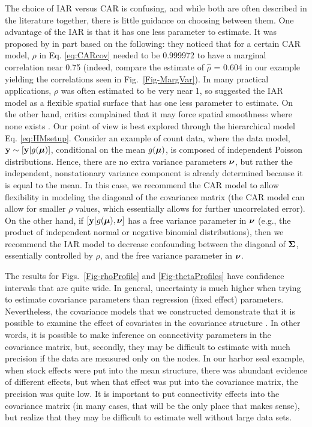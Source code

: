 \documentclass[11pt, titlepage]{article}\usepackage[]{graphicx}\usepackage[]{color}
\begin{document}
\begin{spacing}{1.9}
\begin{flushleft}
The choice of IAR versus CAR is confusing, and while both are often described in the literature together, there is little guidance on choosing between them.  One advantage of the IAR is that it has one less parameter to estimate.  It was proposed by \citet{Besa:Koop:cond:1995} in part based on the following: they noticed that for a certain CAR model, $\rho$ in Eq. \ref{eq:CARcov} needed to be 0.999972 to have a marginal correlation near 0.75 (indeed, compare the estimate of $\hat{\rho}$ = 0.604 in our example yielding the correlations seen in Fig.~\ref{Fig-MargVar}). In many practical applications, $\rho$ was often estimated to be very near 1, so \citet{Besa:Koop:cond:1995} suggested the IAR model as a flexible spatial surface that has one less parameter to estimate.  On the other hand, critics complained that it may force spatial smoothness where none exists \citep[e.g.,][]{Lero:Lei:Bres:esti:2000}. Our point of view is best explored through the hierarchical model Eq. \ref{eq:HMsetup}.  Consider an example of count data, where the data model, $\mathbf{y} \sim [\mathbf{y}|g(\mbox{\boldmath $\mu$})]$, conditional on the mean $g(\mbox{\boldmath $\mu$})$, is composed of independent Poisson distributions. Hence, there are no extra variance parameters $\mbox{\boldmath $\nu$}$, but rather the independent, nonstationary variance component is already determined because it is equal to the mean. In this case, we recommend the CAR model to allow flexibility in modeling the diagonal of the covariance matrix (the CAR model can allow for smaller $\rho$ values, which essentially allows for further uncorrelated error).  On the other hand, if $[\mathbf{y}|g(\mbox{\boldmath $\mu$}),\mbox{\boldmath $\nu$}]$ has a free variance parameter in $\mbox{\boldmath $\nu$}$ (e.g., the product of independent normal or negative binomial distributions), then we recommend the IAR model to decrease confounding between the diagonal of $\mbox{\boldmath $\Sigma$}$, essentially controlled by $\rho$, and the free variance parameter in $\mbox{\boldmath $\nu$}$.

The results for Figs.~\ref{Fig-rhoProfile} and \ref{Fig-thetaProfiles} have confidence intervals that are quite wide.  In general, uncertainty is much higher when trying to estimate covariance parameters than regression (fixed effect) parameters. Nevertheless, the covariance models that we constructed demonstrate that it is possible to examine the effect of covariates in the covariance structure \citep[see also][]{Hank:Hoot:circ:2013}.  In other words, it is possible to make inference on connectivity parameters in the covariance matrix, but, secondly, they may be difficult to estimate with much precision if the data are measured only on the nodes.  In our harbor seal example, when stock effects were put into the mean structure, there was abundant evidence of different effects, but when that effect was put into the covariance matrix, the precision was quite low.  It is important to put connectivity effects into the covariance matrix (in many cases, that will be the only place that makes sense), but realize that they may be difficult to estimate well without large data sets.


\end{flushleft}
\end{spacing}
\end{document}
